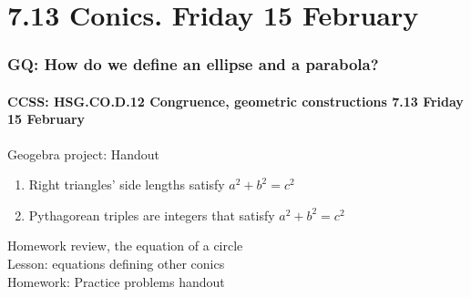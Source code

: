 \documentclass{beamer}
\begin{document}
\section{7.13 Conics. Friday 15 February}
  \frame
  {
    \frametitle{GQ: How do we define an ellipse and a parabola?}
    \framesubtitle{CCSS: HSG.CO.D.12 Congruence, geometric constructions \hfill \alert{7.13 Friday 15 February}}

    \begin{block}{Geogebra project: Handout}
      \begin{enumerate}
        \item Right triangles' side lengths satisfy $a^2+b^2=c^2$
        \item Pythagorean triples are integers that satisfy $a^2+b^2=c^2$
      \end{enumerate}
    \end{block}
    Homework review, the equation of a circle\\
    Lesson: equations defining other conics\\[0.5cm]
    Homework: Practice problems handout
  }
\end{document}
